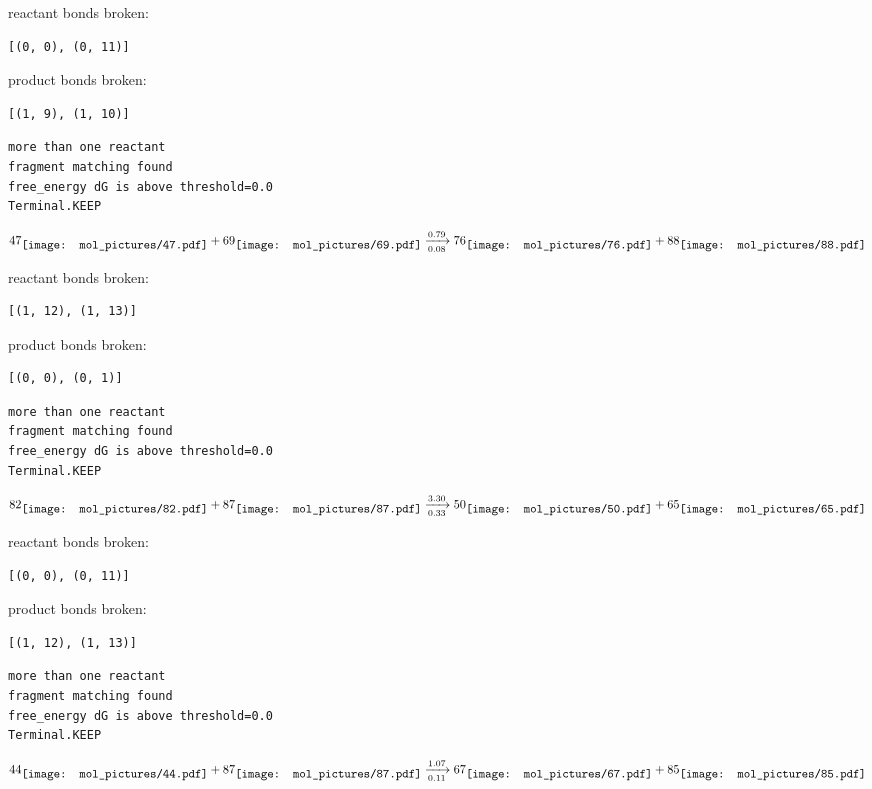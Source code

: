\documentclass{article}
\begin{document}
reactant bonds broken:\begin{verbatim}
[(0, 0), (0, 11)]
\end{verbatim}
product bonds broken:\begin{verbatim}
[(1, 9), (1, 10)]
\end{verbatim}




\vspace{1cm}
\begin{verbatim}
more than one reactant
fragment matching found
free_energy dG is above threshold=0.0
Terminal.KEEP
\end{verbatim}
$$
47
\raisebox{-.5\height}{\texttt{[image: mol\_pictures/47.pdf]}}
+
69
\raisebox{-.5\height}{\texttt{[image: mol\_pictures/69.pdf]}}
\xrightarrow[0.08]{0.79}
76
\raisebox{-.5\height}{\texttt{[image: mol\_pictures/76.pdf]}}
+
88
\raisebox{-.5\height}{\texttt{[image: mol\_pictures/88.pdf]}}
$$


reactant bonds broken:\begin{verbatim}
[(1, 12), (1, 13)]
\end{verbatim}
product bonds broken:\begin{verbatim}
[(0, 0), (0, 1)]
\end{verbatim}




\vspace{1cm}
\begin{verbatim}
more than one reactant
fragment matching found
free_energy dG is above threshold=0.0
Terminal.KEEP
\end{verbatim}
$$
82
\raisebox{-.5\height}{\texttt{[image: mol\_pictures/82.pdf]}}
+
87
\raisebox{-.5\height}{\texttt{[image: mol\_pictures/87.pdf]}}
\xrightarrow[0.33]{3.30}
50
\raisebox{-.5\height}{\texttt{[image: mol\_pictures/50.pdf]}}
+
65
\raisebox{-.5\height}{\texttt{[image: mol\_pictures/65.pdf]}}
$$


reactant bonds broken:\begin{verbatim}
[(0, 0), (0, 11)]
\end{verbatim}
product bonds broken:\begin{verbatim}
[(1, 12), (1, 13)]
\end{verbatim}




\vspace{1cm}
\begin{verbatim}
more than one reactant
fragment matching found
free_energy dG is above threshold=0.0
Terminal.KEEP
\end{verbatim}
$$
44
\raisebox{-.5\height}{\texttt{[image: mol\_pictures/44.pdf]}}
+
87
\raisebox{-.5\height}{\texttt{[image: mol\_pictures/87.pdf]}}
\xrightarrow[0.11]{1.07}
67
\raisebox{-.5\height}{\texttt{[image: mol\_pictures/67.pdf]}}
+
85
\raisebox{-.5\height}{\texttt{[image: mol\_pictures/85.pdf]}}
$$
\end{document}
